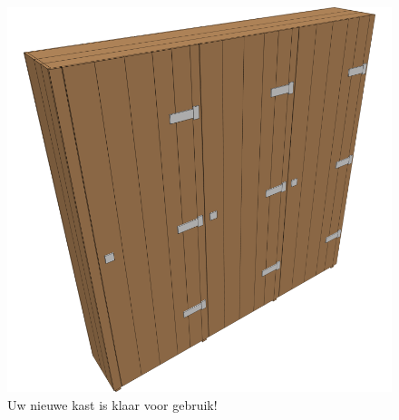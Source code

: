 \documentclass{article}
\begin{document}
\begin{figure}[h!]
    \centering
    \includegraphics[width=\textwidth]{scene 12 - compleet.png}
    \caption{Uw nieuwe kast is klaar voor gebruik!}
\end{figure}
\end{document}
